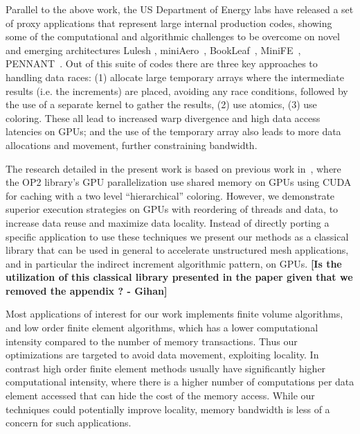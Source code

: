 Parallel to the above work, the US Department of Energy labs have released a 
set of proxy applications that represent large internal production codes,
showing some of the computational and algorithmic challenges to be overcome on 
novel and emerging architectures Lulesh \cite{LULESH2:changes}, 
miniAero~\cite{miniaero}, BookLeaf~\cite{bookleaf}, MiniFE~\cite{minife}, 
PENNANT~\cite{pennant}. Out of this suite of codes there are three key 
approaches to handling data races: (1) allocate large temporary arrays where 
the intermediate results (i.e. the increments) are placed, avoiding any race 
conditions, followed by the use of a separate kernel to gather the results, 
(2) use atomics, (3) use coloring. These all lead to increased warp divergence 
and high data access latencies on GPUs; and the use of the temporary array also 
leads to more data allocations and movement, further constraining bandwidth. 

The research detailed in the present work is based on previous work 
in~\cite{op2}, where the OP2 library's GPU parallelization use shared memory on 
GPUs using CUDA for caching with a two level ``hierarchical'' coloring. However, 
we demonstrate superior execution strategies on GPUs with reordering of threads 
and data, to increase data reuse and maximize data locality. Instead of directly 
porting a specific application to use these techniques we present our methods 
as a classical library that can be used in general to accelerate unstructured 
mesh applications, and in particular the indirect increment algorithmic 
pattern, on GPUs. \textbf{[Is the utilization of this classical library 
presented in the paper given that we removed the appendix ? - Gihan]}

Most applications of interest for our work implements finite volume algorithms, 
and low order finite element algorithms, which has a lower computational 
intensity compared to the number of memory transactions. Thus our optimizations 
are targeted to avoid data movement, exploiting locality. In contrast high 
order finite element methods usually have significantly higher computational 
intensity, where there is a higher number of computations per data element 
accessed that can hide the cost of the memory access. While our techniques could 
potentially improve locality, memory bandwidth is less of a concern for such 
applications.


